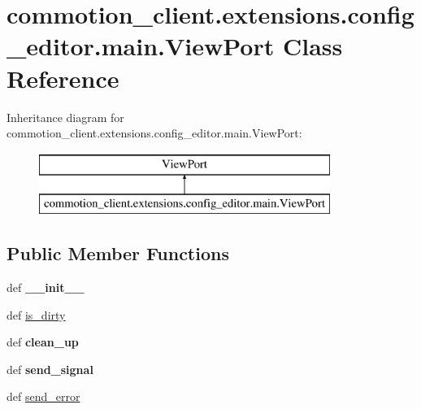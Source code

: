 \hypertarget{classcommotion__client_1_1extensions_1_1config__editor_1_1main_1_1ViewPort}{\section{commotion\+\_\+client.\+extensions.\+config\+\_\+editor.\+main.\+View\+Port Class Reference}
\label{classcommotion__client_1_1extensions_1_1config__editor_1_1main_1_1ViewPort}
}
Inheritance diagram for commotion\+\_\+client.\+extensions.\+config\+\_\+editor.\+main.\+View\+Port\+:\begin{figure}[H]
\begin{center}
\leavevmode
\includegraphics[height=2.000000cm]{classcommotion__client_1_1extensions_1_1config__editor_1_1main_1_1ViewPort}
\end{center}
\end{figure}
\subsection*{Public Member Functions}
\begin{DoxyCompactItemize}
\item 
\hypertarget{classcommotion__client_1_1extensions_1_1config__editor_1_1main_1_1ViewPort_ae9816d12a867e5655be6f810879fb44c}{def {\bfseries \+\_\+\+\_\+init\+\_\+\+\_\+}}\label{classcommotion__client_1_1extensions_1_1config__editor_1_1main_1_1ViewPort_ae9816d12a867e5655be6f810879fb44c}

\item 
def \hyperlink{classcommotion__client_1_1extensions_1_1config__editor_1_1main_1_1ViewPort_a945083e6af1674bdd5cd585fd06a5e60}{is\+\_\+dirty}
\item 
\hypertarget{classcommotion__client_1_1extensions_1_1config__editor_1_1main_1_1ViewPort_a9542b03815bcd39af6208379d4c4f010}{def {\bfseries clean\+\_\+up}}\label{classcommotion__client_1_1extensions_1_1config__editor_1_1main_1_1ViewPort_a9542b03815bcd39af6208379d4c4f010}

\item 
\hypertarget{classcommotion__client_1_1extensions_1_1config__editor_1_1main_1_1ViewPort_a1d04400c68693b3e12de487b21d94349}{def {\bfseries send\+\_\+signal}}\label{classcommotion__client_1_1extensions_1_1config__editor_1_1main_1_1ViewPort_a1d04400c68693b3e12de487b21d94349}

\item 
def \hyperlink{classcommotion__client_1_1extensions_1_1config__editor_1_1main_1_1ViewPort_a09ed3f1dcbee6e902ee8cc00a2e85091}{send\+\_\+error}
\end{DoxyCompactItemize}
